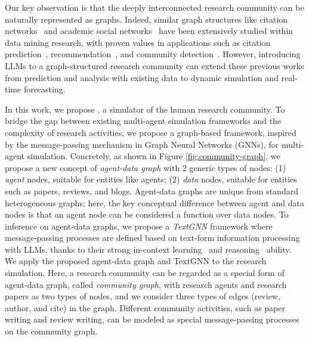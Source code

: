 Our key observation is that the deeply interconnected research community can be naturally represented as graphs. Indeed, similar graph structures like citation networks~\citep{newman2001structure} and academic social networks~\citep{Tang2008ArnetMinerEA} have been extensively studied within data mining research, with proven values in applications such as citation prediction~\citep{holm2020longitudinal}, recommendation~\citep{West2016ARS}, and community detection~\citep{Yang2012DefiningAE}.
However, introducing LLMs to a graph-structured research community can extend these previous works from prediction and analysis with existing data to dynamic simulation and real-time forecasting.

In this work, we propose \envname, a simulator of the human research community. To bridge the gap between existing multi-agent simulation frameworks and the complexity of research activities, we propose a graph-based framework, inspired by the message-passing mechanism in Graph Neural Networks (GNNs), for multi-agent simulation.
Concretely, as shown in Figure \ref{fig:community-graph}, we propose a new concept of \textit{agent-data graph} with 2 generic types of nodes: (1) \textit{agent} nodes, suitable for entities like agents; (2) \textit{data} nodes, suitable for entities such as papers, reviews, and blogs. 
Agent-data graphs are unique from standard heterogeneous graphs; here, the key conceptual difference between agent and data nodes is that an agent node can be considered a function over data nodes.
To inference on agent-data graphs, we propose a \textit{TextGNN} framework where message-passing processes are defined based on text-form information processing with LLMs, thanks to their strong in-context learning~\citep{wei2023larger} and reasoning~\citep{lee2024reasoning} ability. 
We apply the proposed agent-data graph and TextGNN to the research simulation. Here, a research community can be regarded as a special form of agent-data graph, called \textit{community graph}, with research agents and research papers as two types of nodes, and we consider three types of edges (review, author, and cite) in the graph. Different community activities, such as paper writing and review writing, can be modeled as special message-passing processes on the community graph.




